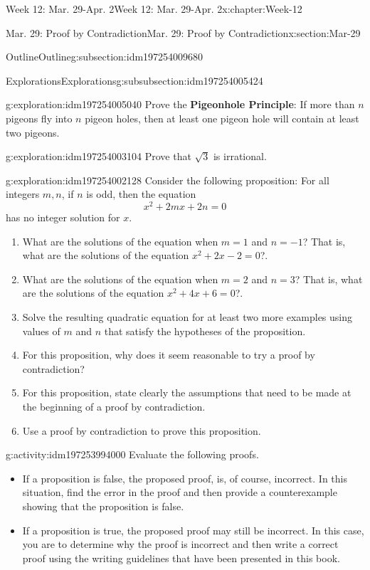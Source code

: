 \documentclass[oneside,10pt,]{book}
\newcommand{\terminology}[1]{\textbf{#1}}
\numberwithin{equation}{section}
\begin{document}
\begin{chapterptx}{Week 12: Mar. 29-Apr. 2}{}{Week 12: Mar. 29-Apr. 2}{}{}{x:chapter:Week-12}
\begin{sectionptx}{Mar. 29: Proof by Contradiction}{}{Mar. 29: Proof by Contradiction}{}{}{x:section:Mar-29}
\begin{subsectionptx}{Outline}{}{Outline}{}{}{g:subsection:idm197254009680}
%
\begin{subsubsectionptx}{Explorations}{}{Explorations}{}{}{g:subsubsection:idm197254005424}
\begin{exploration}{}{g:exploration:idm197254005040}%
Prove the \terminology{Pigeonhole Principle}: If more than \(n\) pigeons fly into \(n\) pigeon holes, then at least one pigeon hole will contain at least two pigeons.%
\end{exploration}%
\begin{exploration}{}{g:exploration:idm197254003104}%
Prove that \(\sqrt{3}\) is irrational.%
\end{exploration}%
\begin{exploration}{}{g:exploration:idm197254002128}%
Consider the following proposition: For all integers \(m,n\), if \(n\) is odd, then the equation%
\begin{equation*}
x^2 + 2mx + 2n = 0
\end{equation*}
has no integer solution for \(x\).%
%
\begin{enumerate}
\item{}What are the solutions of the equation when \(m=1\) and \(n=-1\)? That is, what are the solutions of the equation \(x^2 + 2x - 2 = 0\)?.%
\item{}What are the solutions of the equation when \(m=2\) and \(n=3\)? That is, what are the solutions of the equation \(x^2 + 4x +6 = 0\)?.%
\item{}Solve the resulting quadratic equation for at least two more examples using values of \(m\) and \(n\) that satisfy the hypotheses of the proposition.%
\item{}For this proposition, why does it seem reasonable to try a proof by contradiction?%
\item{}For this proposition, state clearly the assumptions that need to be made at the beginning of a proof by contradiction.%
\item{}Use a proof by contradiction to prove this proposition.%
\end{enumerate}
\end{exploration}%
\begin{activity}{}{g:activity:idm197253994000}%
Evaluate the following proofs.%
\begin{itemize}[label=\textbullet]
\item{}If a proposition is false, the proposed proof, is, of course, incorrect. In this situation, find the error in the proof and then provide a counterexample showing that the proposition is false.%
\item{}If a proposition is true, the proposed proof may still be incorrect. In this case, you are to determine why the proof is incorrect and then write a correct proof using the writing guidelines that have been presented in this book.%

\end{itemize}
\end{activity}
\end{subsubsectionptx}
\end{subsectionptx}
\end{sectionptx}
\end{chapterptx}
\end{document}

